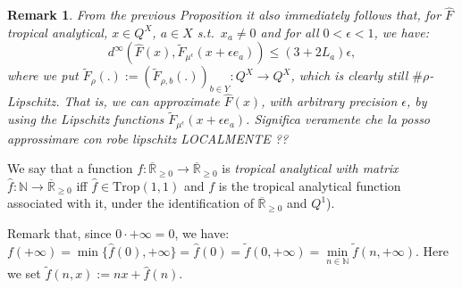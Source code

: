 \documentclass[submission,copyright,creativecommons]{eptcs}
\newtheorem{Remark}[theorem]{Remark}
\newcommand{\N}{\mathbb{N}}
\newcommand{\R}{\mathbb{R}}
\newcommand{\set}[1]{\{#1\}}
\newcommand{\alarm}[1]{\color{red}#1\color{black}}
\begin{document}
\begin{Remark}
 From the previous Proposition it also immediately follows that, for $\hat F$ tropical analytical, $x\in Q^X$, $a\in X$ s.t.\ $x_a\neq 0$ and for all $0<\epsilon<1$, we have:
\[
 d^{\infty}(\hat{F}(x) , \widetilde{F}_{\mu^\epsilon}(x+\epsilon e_a)) \leq (3+2L_a)\epsilon,
\]
where we put $ \widetilde{F}_{\rho}(.):= (\widetilde{F}_{\rho,b}(.))_{b\in Y}:Q^X\to Q^X$, which is clearly still $\#\rho$-Lipschitz.
That is, we can approximate $\hat{F}(x)$, with arbitrary precision $\epsilon$, by using the Lipschitz functions $\widetilde{F}_{\mu^\epsilon}(x+\epsilon e_a)$.
\alarm{Significa veramente che la posso approssimare con robe lipschitz \emph{LOCALMENTE} ??}
\end{Remark}

We say that a function $f:\overline{\R}_{\geq 0} \to \overline{\R}_{\geq 0}$ is \emph{tropical analytical with matrix $\hat f : \N \to \overline{\R}_{\geq 0}$} iff $\hat f\in\mathrm{Trop}(1,1)$ and $f$ is the tropical analytical function associated with it, under the identification of $\overline{\R}_{\geq 0}$ and $Q^1$).

Remark that, since $0\cdot +\infty = 0$, we have: $f(+\infty)=\min\set{\hat f(0),+\infty}=\hat f(0) = \widetilde f(0,+\infty)=\min\limits_{n\in\N} \widetilde f(n,+\infty)$.
Here we set $\widetilde f(n,x):=nx+\hat f(n)$.
\end{document}
